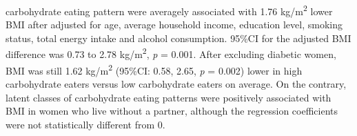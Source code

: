   carbohydrate eating pattern were averagely associated with 1.76 kg/m\textsuperscript{2} lower BMI after adjusted for age, average household income, education level, smoking status, total energy intake and alcohol consumption. 95\%CI for the adjusted BMI difference was 0.73 to 2.78 kg/m\textsuperscript{2}, \textit{p} = 0.001. After excluding diabetic women, BMI was still 1.62 kg/m\textsuperscript{2} (95\%CI: 0.58, 2.65, \textit{p} = 0.002) lower in high carbohydrate eaters versus low carbohydrate eaters on average. On the contrary, latent classes of carbohydrate eating patterns were positively associated with BMI in women who live without a partner, although the regression coefficients were not statistically different from 0. 



\begin{table}[H]
	

\end{table}
